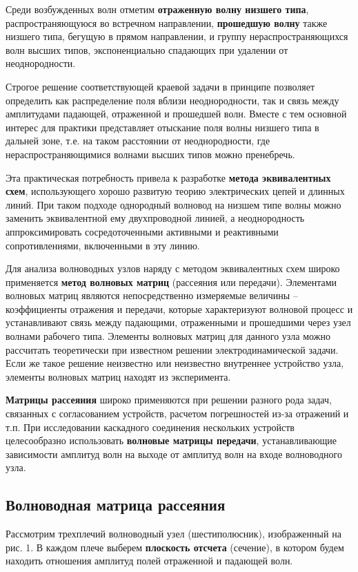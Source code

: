 ﻿\documentclass[a4paper,11pt]{article}
\begin{document}
Среди возбужденных волн отметим \textbf{отраженную волну низшего типа}, распространяющуюся во встречном направлении, \textbf{прошедшую волну} также низшего типа, бегущую в прямом направлении, и группу нераспространяющихся волн высших типов, экспоненциально спадающих при удалении от неоднородности.

Строгое решение соответствующей краевой задачи в принципе позволяет определить как распределение поля вблизи неоднородности, так и связь между амплитудами падающей, отраженной и прошедшей волн.
 Вместе с тем основной интерес для практики представляет отыскание поля волны низшего типа в дальней зоне, т.е. на таком расстоянии от неоднородности, где нераспространяющимися волнами высших типов можно пренебречь.

Эта практическая потребность привела к разработке \textbf{метода эквивалентных схем}, использующего хорошо развитую теорию электрических цепей и длинных линий. 
При таком подходе однородный волновод на низшем типе волны можно заменить эквивалентной ему двухпроводной линией, а неоднородность аппроксимировать сосредоточенными активными и реактивными сопротивлениями, включенными в эту линию.

Для анализа волноводных узлов наряду с методом эквивалентных схем широко применяется \textbf{метод волновых матриц} (рассеяния или передачи). 
Элементами волновых матриц являются непосредственно измеряемые величины -- коэффициенты отражения и передачи, которые характеризуют волновой процесс и устанавливают связь между падающими, отраженными и прошедшими через узел волнами рабочего типа. 
Элементы волновых матриц для данного узла можно рассчитать теоретически при известном решении электродинамической задачи. 
Если же такое решение неизвестно или неизвестно внутреннее устройство узла, элементы волновых матриц находят из эксперимента.

\textbf{Матрицы рассеяния} широко применяются при решении разного рода задач, связанных с согласованием устройств, расчетом погрешностей из-за отражений и т.п. 
При исследовании каскадного соединения нескольких устройств целесообразно использовать \textbf{волновые матрицы передачи}, устанавливающие зависимости амплитуд волн на выходе от амплитуд волн на входе волноводного узла.

\subsection{Волноводная матрица рассеяния}

Рассмотрим трехплечий волноводный узел (шестиполюсник), изображенный на рис. 1. В каждом плече выберем \textbf{плоскость отсчета} (сечение), в котором будем находить отношения амплитуд полей отраженной и падающей волн.
\end{document}

